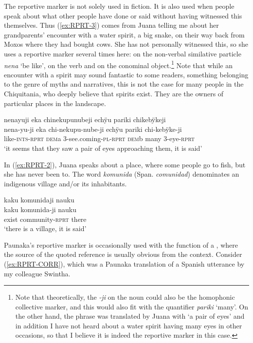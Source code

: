 The reportive marker is not solely used in fiction. It is also used when people speak about what other people have done or said without having witnessed this themselves. Thus (\ref{ex:RPRT-3}) comes from Juana telling me about her grandparents’ encounter with a water spirit, a big snake, on their way back from Moxos where they had bought cows. She has not personally witnessed this, so she uses a reportive marker several times here: on the non-verbal similative particle \textit{nena} ‘be like’, on the verb and on the conominal object.\footnote{Note that theoretically, the \textit{-ji} on the noun could also be the homophonic collective marker, and this would also fit with the quantifier \textit{pariki} ‘many’. On the other hand, the phrase was translated by Juana with ‘a pair of eyes’ and in addition I have not heard about a water spirit having many eyes in other occasions, so that I believe it is indeed the reportive marker in this case.} Note that while an encounter with a spirit may sound fantastic to some readers, something belonging to the genre of myths and narratives, this is not the case for many people in the Chiquitania, who deeply believe that spirits exist. They are the owners of particular places in the landscape.

\ea\label{ex:RPRT-3}
\begingl
\glpreamble nenayuji eka chinekupunubeji echÿu pariki chikebÿkeji\\
\gla nena-yu-ji eka chi-nekupu-nube-ji echÿu pariki chi-kebÿke-ji\\
\glb like-\textsc{ints}-\textsc{rprt} \textsc{dem}a 3-see.coming-\textsc{pl}-\textsc{rprt} \textsc{dem}b many 3-eye-\textsc{rprt}\\
\glft ‘it seems that they saw a pair of eyes approaching them, it is said’
\endgl
\trailingcitation{[jxx-p151016l-2.090]}
\xe

In (\ref{ex:RPRT-2}), Juana speaks about a place, where some people go to fish, but she has never been to. The word \textit{komunida} (Span. \textit{comunidad}) denominates an indigenous village and/or its inhabitants.

\ea\label{ex:RPRT-2}
\begingl
\glpreamble kaku komunidaji nauku\\
\gla kaku komunida-ji nauku\\
\glb exist community-\textsc{rprt} there\\
\glft ‘there is a village, it is said’
\endgl
\trailingcitation{[jxx-e190210s-01]}
\xe


Paunaka’s reportive marker is occasionally used with the function of a , where the source of the quoted reference is usually obvious from the context. Consider (\ref{ex:RPRT-CORR}), which was a Paunaka translation of a Spanish utterance by my colleague Swintha.

